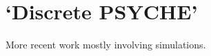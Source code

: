 \section{`Discrete PSYCHE'}
\label{sec:pureshift__dpsyche}

More recent work mostly involving simulations.
